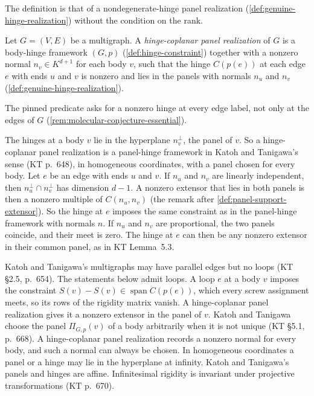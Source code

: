 The definition is that of a nondegenerate-hinge panel realization
(\cref{def:genuine-hinge-realization}) without the condition on the
rank.

\begin{definition}
  \label{def:coplanar-panel-realization}
  \leanok
  Let $G = (V, E)$ be a multigraph. A \emph{hinge-coplanar panel
  realization} of $G$ is a body-hinge framework $(G,p)$
  (\cref{def:hinge-constraint}) together with a nonzero normal
  $n_v \in K^{d+1}$ for each body $v$, such that the hinge $C(p(e))$ at
  each edge $e$ with ends $u$ and $v$ is nonzero and lies in the panels
  with normals $n_u$ and $n_v$ (\cref{def:genuine-hinge-realization}).
\end{definition}

\begin{fmlnote}
  The pinned predicate asks for a nonzero hinge at every edge label, not
  only at the edges of $G$ (\cref{rem:molecular-conjecture-essential}).
\end{fmlnote}

The hinges at a body $v$ lie in the hyperplane $n_v^\perp$, the panel of
$v$. So a hinge-coplanar panel realization is a panel-hinge framework in
Katoh and Tanigawa's sense (KT p.~648), in homogeneous coordinates, with
a panel chosen for every body. Let $e$ be an edge with ends $u$ and $v$.
If $n_u$ and $n_v$ are linearly independent, then
$n_u^\perp \cap n_v^\perp$ has dimension $d - 1$. A nonzero extensor
that lies in both panels is then a nonzero multiple of $C(n_u, n_v)$
(the remark after \cref{def:panel-support-extensor}). So the hinge at
$e$ imposes the same constraint as in the panel-hinge framework with
normals $n$. If $n_u$ and $n_v$ are proportional,
the two panels coincide, and their meet is zero. The hinge at $e$ can
then be any nonzero extensor in their common panel, as in KT Lemma~5.3.

\begin{remark}
  \label{rem:coplanar-conventions}
  Katoh and Tanigawa's multigraphs may have parallel edges but no loops
  (KT \S2.5, p.~654). The statements below admit loops. A loop $e$ at a
  body $v$ imposes the constraint
  $S(v) - S(v) \in \operatorname{span} C(p(e))$, which every screw
  assignment meets, so its rows of the rigidity matrix vanish. A
  hinge-coplanar panel realization gives it a nonzero extensor in the
  panel of $v$. Katoh and Tanigawa choose the panel $\Pi_{G,p}(v)$ of a
  body arbitrarily when it is not unique (KT \S5.1, p.~668). A
  hinge-coplanar panel realization records a nonzero normal for every
  body, and such a normal can always be chosen. In homogeneous
  coordinates a panel or a hinge may lie in the hyperplane at infinity.
  Katoh and Tanigawa's panels and hinges are affine. Infinitesimal
  rigidity is invariant under projective transformations (KT p.~670).
\end{remark}

